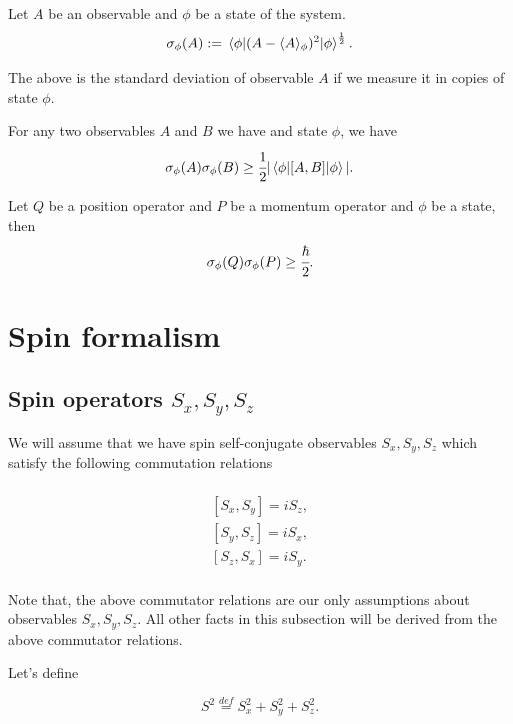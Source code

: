 \documentclass[main.tex]{subfiles}
\begin{document}
\begin{definition}
Let $A$ be an observable and $\phi$ be a state of the system.
\begin{equation}
\sigma_\phi(A) := \mel{\phi}{(A - \langle A \rangle_\phi)^2}{\phi}^{\frac{1}{2}}.
\end{equation}
\end{definition}
The above is the standard deviation of observable $A$ if we measure it in copies of state $\phi$.

\begin{theorem}
For any two observables $A$ and $B$ we have and state $\phi$, we have
\begin{equation}
\sigma_\phi(A)\sigma_\phi(B) \geq \cfrac{1}{2} |\mel{\phi}{[A,B]}{\phi}|.
\end{equation}
\end{theorem}
\begin{corollary} Let $Q$ be a position operator and $P$ be a momentum operator and $\phi$ be a state, then
\begin{equation} 
\sigma_\phi(Q)\sigma_\phi(P) \geq \cfrac{\hbar}{2}.
\end{equation}
\end{corollary}
\section{Spin formalism}


\subsection{Spin operators $S_x, S_y, S_z$}

We will assume that we have spin self-conjugate observables $S_x, S_y, S_z$ which satisfy the following commutation relations

\begin{multline}
\label{spin-cummutators}\\
[S_x, S_y] = iS_z,\\
[S_y, S_z] = iS_x,\\
[S_z, S_x] = iS_y.\\
\end{multline}

Note that, the above commutator relations are our only assumptions about observables $S_x, S_y, S_z$. 
All other facts in this subsection will be derived from the above commutator relations.

Let's define

\begin{equation}
S^2  \stackrel{def}{=} S^2_x + S^2_y + S^2_z.
\end{equation}
\end{document}
